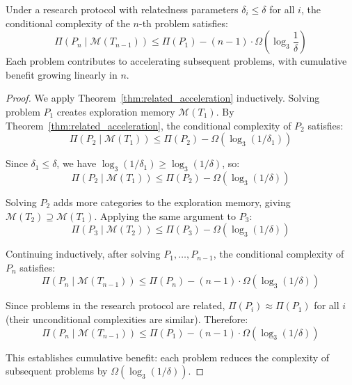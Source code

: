 \begin{theorem}
\label{thm:cumulative_benefit}
Under a research protocol with relatedness parameters $\delta_i \leq \delta$ for all $i$, the conditional complexity of the $n$-th problem satisfies:
\begin{equation}
\Pi(P_n \mid \mathcal{M}(T_{n-1})) \leq \Pi(P_1) - (n-1) \cdot \Omega\left(\log_3\frac{1}{\delta}\right)
\label{eq:cumulative_benefit}
\end{equation}
Each problem contributes to accelerating subsequent problems, with cumulative benefit growing linearly in $n$.
\end{theorem}

\begin{proof}
We apply Theorem~\ref{thm:related_acceleration} inductively. Solving problem $P_1$ creates exploration memory $\mathcal{M}(T_1)$. By Theorem~\ref{thm:related_acceleration}, the conditional complexity of $P_2$ satisfies:
\begin{equation}
\Pi(P_2 \mid \mathcal{M}(T_1)) \leq \Pi(P_2) - \Omega(\log_3(1/\delta_1))
\end{equation}

Since $\delta_1 \leq \delta$, we have $\log_3(1/\delta_1) \geq \log_3(1/\delta)$, so:
\begin{equation}
\Pi(P_2 \mid \mathcal{M}(T_1)) \leq \Pi(P_2) - \Omega(\log_3(1/\delta))
\end{equation}

Solving $P_2$ adds more categories to the exploration memory, giving $\mathcal{M}(T_2) \supseteq \mathcal{M}(T_1)$. Applying the same argument to $P_3$:
\begin{equation}
\Pi(P_3 \mid \mathcal{M}(T_2)) \leq \Pi(P_3) - \Omega(\log_3(1/\delta))
\end{equation}

Continuing inductively, after solving $P_1, \ldots, P_{n-1}$, the conditional complexity of $P_n$ satisfies:
\begin{equation}
\Pi(P_n \mid \mathcal{M}(T_{n-1})) \leq \Pi(P_n) - (n-1) \cdot \Omega(\log_3(1/\delta))
\end{equation}

Since problems in the research protocol are related, $\Pi(P_i) \approx \Pi(P_1)$ for all $i$ (their unconditional complexities are similar). Therefore:
\begin{equation}
\Pi(P_n \mid \mathcal{M}(T_{n-1})) \leq \Pi(P_1) - (n-1) \cdot \Omega(\log_3(1/\delta))
\end{equation}

This establishes cumulative benefit: each problem reduces the complexity of subsequent problems by $\Omega(\log_3(1/\delta))$.
\end{proof}

